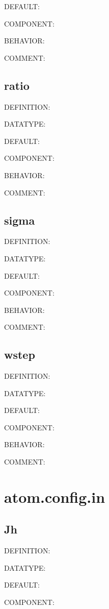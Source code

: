 {\color{blue}DEFAULT:}

{\color{brown}COMPONENT:}

{\color{purple}BEHAVIOR:}

{\color{olive}COMMENT:}

\subsection{ratio}
{\color{red}DEFINITION:}

{\color{green}DATATYPE:}

{\color{blue}DEFAULT:}

{\color{brown}COMPONENT:}

{\color{purple}BEHAVIOR:}

{\color{olive}COMMENT:}

\subsection{sigma}
{\color{red}DEFINITION:}

{\color{green}DATATYPE:}

{\color{blue}DEFAULT:}

{\color{brown}COMPONENT:}

{\color{purple}BEHAVIOR:}

{\color{olive}COMMENT:}

\subsection{wstep}
{\color{red}DEFINITION:}

{\color{green}DATATYPE:}

{\color{blue}DEFAULT:}

{\color{brown}COMPONENT:}

{\color{purple}BEHAVIOR:}

{\color{olive}COMMENT:}

\section{atom.config.in}
\subsection{Jh}
{\color{red}DEFINITION:}

{\color{green}DATATYPE:}

{\color{blue}DEFAULT:}

{\color{brown}COMPONENT:}

